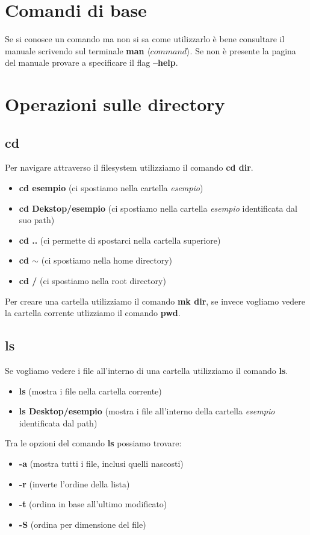\documentclass[oneside,a4paper,11pt]{book}
\theoremstyle{italicstyle}
\theoremstyle{normStyle}
\begin{document}
\section{Comandi di base}
Se si conosce un comando ma non si sa come utilizzarlo è bene consultare il manuale scrivendo sul terminale \textbf{man} $\langle command \rangle$. Se non è presente la pagina del manuale provare a specificare il flag \textbf{--help}. 

\section{Operazioni sulle directory}
\subsection{cd}
Per navigare attraverso il filesystem utilizziamo il comando \textbf{cd dir}.
\begin{itemize}
    \item \textbf{cd esempio} (ci spostiamo nella cartella \textit{esempio})
    \item \textbf{cd Dekstop/esempio} (ci spostiamo nella cartella \textit{esempio} identificata dal suo path)
    \item \textbf{cd ..} (ci permette di spostarci nella cartella superiore)
    \item \textbf{cd $\sim$} (ci spostiamo nella home directory)
    \item \textbf{cd /} (ci spostiamo nella root directory)
\end{itemize}
Per creare una cartella utilizziamo il comando \textbf{mk dir}, se invece vogliamo vedere la cartella corrente utlizziamo il comando \textbf{pwd}.

\subsection{ls}
Se vogliamo vedere i file all'interno di una cartella utilizziamo il comando \textbf{ls}.
\begin{itemize}
    \item \textbf{ls} (mostra i file nella cartella corrente)
    \item \textbf{ls Desktop/esempio} (mostra i file all'interno della cartella \textit{esempio} identificata dal path)
\end{itemize}
Tra le opzioni del comando \textbf{ls} possiamo trovare:
\begin{itemize}
    \item \textbf{-a} (mostra tutti i file, inclusi quelli nascosti)
    \item \textbf{-r} (inverte l'ordine della lista)
    \item \textbf{-t} (ordina in base all'ultimo modificato)
    \item \textbf{-S} (ordina per dimensione del file)
\end{itemize}
\end{document}
